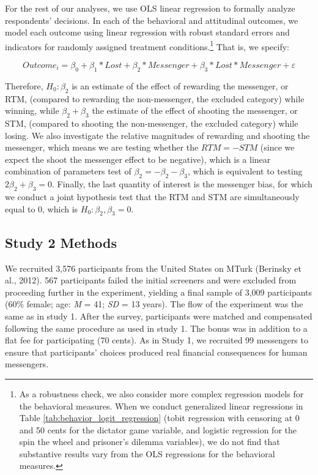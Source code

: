 For the rest of our analyses, we use OLS linear regression to formally
analyze respondents' decisions. In each of the behavioral and attitudinal
outcomes, we model each outcome using linear regression with robust
standard errors and indicators for randomly assigned treatment
conditions.\footnote{As a robustness check, we also consider
more complex regression models for the behavioral measures. 
When we conduct generalized linear regressions in Table \ref{tab:behavior_logit_regression} 
(tobit regression with censoring at 0 and 50 cents for the dictator game variable, 
and logistic regression for the spin the wheel and prisoner’s dilemma variables), 
we do not find that substantive results vary from the OLS regressions for the behavioral measures.} 
That is, we specify:

\[{Outcome}_{i} = \beta_{0} + \beta_{1}*Lost  + \beta_{2}*Messenger + \beta_{3}*Lost*Messenger + \varepsilon\]

Therefore, $H_0\colon \beta_2$ is an estimate of the effect
of rewarding the messenger, or RTM, (compared to rewarding the
non-messenger, the excluded category) while winning, while
$\beta_2 + \beta_3$ the estimate of the
effect of shooting the messenger, or STM, (compared to shooting the
non-messenger, the excluded category) while losing. We also investigate the relative magnitudes of rewarding and shooting the messenger, which
means we are testing whether the $RTM = -STM$ (since we expect the shoot
the messenger effect to be negative), which is a linear combination of
parameters test of $\beta_2 = -\beta_2 -
\beta_3$, which is equivalent to testing
$2\beta_2 + \beta_3 = 0$. Finally, the last quantity of interest is the
messenger bias, for which we conduct a joint hypothesis test that the RTM
and STM are simultaneously equal to 0, which is $H_0\colon \beta_2,
\beta_3 = 0$. 

\subsection{Study 2 Methods}

We recruited 3,576 participants from the United States on MTurk
(Berinsky et al., 2012). 567 participants failed the initial screeners
and were excluded from proceeding further in the experiment, yielding a
final sample of 3,009 participants (60\% female; age: \emph{M} = 41;
\emph{SD} = 13 years). The flow of the experiment was the same as in
study 1. After the survey, participants were matched and compensated
following the same procedure as used in study 1. The bonus was in
addition to a flat fee for participating (70 cents). As in Study 1, we
recruited 99 messengers to ensure that participants' choices produced
real financial consequences for human messengers.

